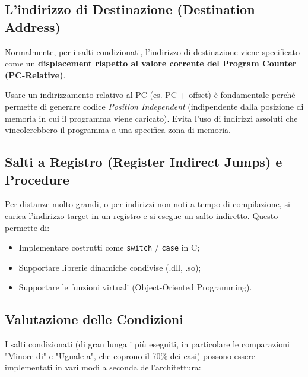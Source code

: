 \subsection{L'indirizzo di Destinazione (Destination Address)}
Normalmente, per i salti condizionati, l'indirizzo di destinazione viene specificato come un \textbf{displacement rispetto al valore corrente del Program Counter (PC-Relative)}.
\begin{remark}
Usare un indirizzamento relativo al PC (es. PC + offset) è fondamentale perché permette di generare codice \textit{Position Independent} (indipendente dalla posizione di memoria in cui il programma viene caricato). Evita l'uso di indirizzi assoluti che vincolerebbero il programma a una specifica zona di memoria.
\end{remark}

\subsection{Salti a Registro (Register Indirect Jumps) e Procedure}
Per distanze molto grandi, o per indirizzi non noti a tempo di compilazione, si carica l'indirizzo target in un registro e si esegue un salto indiretto.
Questo permette di:
\begin{itemize}
    \item Implementare costrutti come \texttt{switch} / \texttt{case} in C;
    \item Supportare librerie dinamiche condivise (.dll, .so);
    \item Supportare le funzioni virtuali (Object-Oriented Programming).
\end{itemize}

\subsection{Valutazione delle Condizioni}
I salti condizionati (di gran lunga i più eseguiti, in particolare le comparazioni "Minore di" e "Uguale a", che coprono il 70\% dei casi) possono essere implementati in vari modi a seconda dell'architettura:

